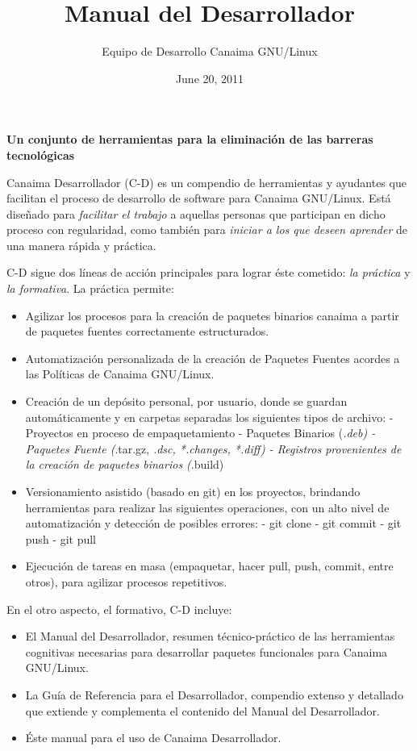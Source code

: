 \documentclass[letterpaper,12pt,spanish]{manual}
\title{Manual del Desarrollador}
\date{June 20, 2011}
\author{Equipo de Desarrollo Canaima GNU/Linux}
\begin{document}
\maketitle
\tableofcontents
\hypertarget{--doc-index}{}


\textbf{Un conjunto de herramientas para la eliminación de las barreras tecnológicas}

Canaima Desarrollador (C-D) es un compendio de herramientas y ayudantes que facilitan el proceso de desarrollo de software para Canaima GNU/Linux. Está diseñado para \emph{facilitar el trabajo} a aquellas personas que participan en dicho proceso con regularidad, como también para \emph{iniciar a los que deseen aprender} de una manera rápida y práctica.

C-D sigue dos líneas de acción principales para lograr éste cometido: \emph{la práctica} y \emph{la formativa}. La práctica permite:
\begin{itemize}
\item {} 
Agilizar los procesos para la creación de paquetes binarios canaima a partir de paquetes fuentes correctamente estructurados.

\item {} 
Automatización personalizada de la creación de Paquetes Fuentes acordes a las Políticas de Canaima GNU/Linux.

\item {} 
Creación de un depósito personal, por usuario, donde se guardan automáticamente y en carpetas separadas los siguientes tipos de archivo:
- Proyectos en proceso de empaquetamiento
- Paquetes Binarios (\emph{.deb)
- Paquetes Fuente (}.tar.gz, \emph{.dsc, *.changes, *.diff)
- Registros provenientes de la creación de paquetes binarios (}.build)

\item {} 
Versionamiento asistido (basado en git) en los proyectos, brindando herramientas para realizar las siguientes operaciones, con un alto nivel de automatización y detección de posibles errores:
- git clone
- git commit
- git push
- git pull

\item {} 
Ejecución de tareas en masa (empaquetar, hacer pull, push, commit, entre otros), para agilizar procesos repetitivos.

\end{itemize}

En el otro aspecto, el formativo, C-D incluye:
\begin{itemize}
\item {} 
El Manual del Desarrollador, resumen técnico-práctico de las herramientas cognitivas necesarias para desarrollar paquetes funcionales para Canaima GNU/Linux.

\item {} 
La Guía de Referencia para el Desarrollador, compendio extenso y detallado que extiende y complementa el contenido del Manual del Desarrollador.

\item {} 
Éste manual para el uso de Canaima Desarrollador.

\end{itemize}
\end{document}
